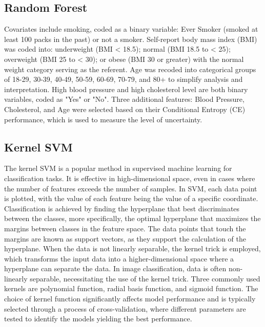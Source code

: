 \documentclass{article}
\begin{document}
\subsection{Random Forest}
Covariates include smoking, coded as a binary variable: Ever Smoker (smoked at least 100 packs in the past) or not a smoker. Self-report body mass index (BMI) was coded into: underweight (BMI < 18.5); normal (BMI 18.5 to < 25); overweight (BMI 25 to < 30); or obese (BMI 30 or greater) with the normal weight category serving as the referent. Age was recoded into categorical groups of 18-29, 30-39, 40-49, 50-59, 60-69, 70-79, and 80+ to simplify analysis and interpretation. High blood pressure and high cholesterol level are both binary variables, coded as "Yes" or "No". Three additional features: Blood Pressure, Cholesterol, and Age were selected based on their Conditional Entropy (CE) performance, which is used to measure the level of uncertainty.

\subsection{Kernel SVM}
The kernel SVM is a popular method in supervised machine learning for classification tasks. It is effective in high-dimensional space, even in cases where the number of features exceeds the number of samples. In SVM, each data point is plotted, with the value of each feature being the value of a specific coordinate. Classification is achieved by finding the hyperplane that best discriminates between the classes, more specifically, the optimal hyperplane that maximizes the margins between classes in the feature space. The data points that touch the margins are known as support vectors, as they support the calculation of the hyperplane. When the data is not linearly separable, the kernel trick is employed, which transforms the input data into a higher-dimensional space where a hyperplane can separate the data. In image classification, data is often non-linearly separable, necessitating the use of the kernel trick. Three commonly used kernels are polynomial function, radial basis function, and sigmoid function. The choice of kernel function significantly affects model performance and is typically selected through a process of cross-validation, where different parameters are tested to identify the models yielding the best performance. 
\end{document}
